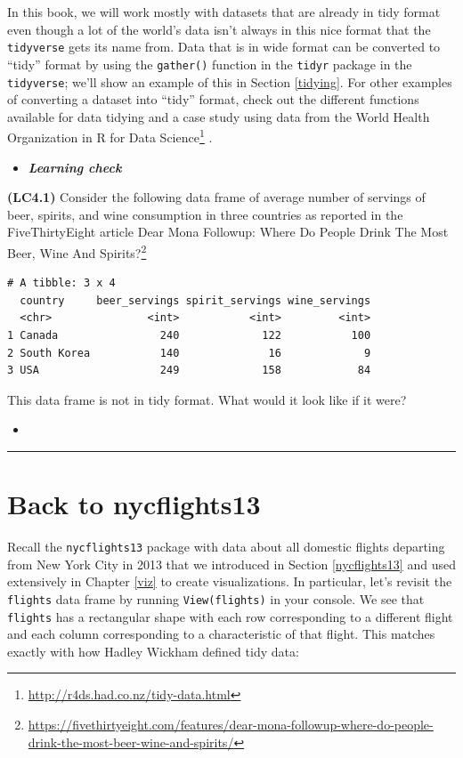 \documentclass[12pt,]{krantz}
\renewcommand{\href}[2]{#2\footnote{\url{#1}}}
\newenvironment{rmdblock}[1]
  {\begin{shaded*}
  \begin{itemize}
  \renewcommand{\labelitemi}{
    \raisebox{-.7\height}[0pt][0pt]{
    }
  }
  \item
  }
  {
  \end{itemize}
  \end{shaded*}
  }
\newenvironment{learncheck}
  {\begin{rmdblock}{warning}}
  {\end{rmdblock}}
\theoremstyle{definition}
\theoremstyle{definition}
\theoremstyle{definition}
\theoremstyle{remark}
\begin{document}
In this book, we will work mostly with datasets that are already in tidy
format even though a lot of the world's data isn't always in this nice
format that the \texttt{tidyverse} gets its name from. Data that is in
wide format can be converted to ``tidy'' format by using the
\texttt{gather()} function in the \texttt{tidyr} package \citep{R-tidyr}
in the \texttt{tidyverse}; we'll show an example of this in Section
\ref{tidying}. For other examples of converting a dataset into ``tidy''
format, check out the different functions available for data tidying and
a case study using data from the World Health Organization in
\href{http://r4ds.had.co.nz/tidy-data.html}{R for Data Science}
\citep{rds2016}.

\begin{learncheck}
\textbf{\emph{Learning check}}
\end{learncheck}

\textbf{(LC4.1)} Consider the following data frame of average number of
servings of beer, spirits, and wine consumption in three countries as
reported in the FiveThirtyEight article
\href{https://fivethirtyeight.com/features/dear-mona-followup-where-do-people-drink-the-most-beer-wine-and-spirits/}{Dear
Mona Followup: Where Do People Drink The Most Beer, Wine And Spirits?}

\begin{verbatim}
# A tibble: 3 x 4
  country     beer_servings spirit_servings wine_servings
  <chr>               <int>           <int>         <int>
1 Canada                240             122           100
2 South Korea           140              16             9
3 USA                   249             158            84
\end{verbatim}

This data frame is not in tidy format. What would it look like if it
were?

\begin{learncheck}

\end{learncheck}

\begin{center}\rule{0.5\linewidth}{\linethickness}\end{center}

\section{Back to nycflights13}\label{back-to-nycflights13}

Recall the \texttt{nycflights13} package with data about all domestic
flights departing from New York City in 2013 that we introduced in
Section \ref{nycflights13} and used extensively in Chapter \ref{viz} to
create visualizations. In particular, let's revisit the \texttt{flights}
data frame by running \texttt{View(flights)} in your console. We see
that \texttt{flights} has a rectangular shape with each row
corresponding to a different flight and each column corresponding to a
characteristic of that flight. This matches exactly with how Hadley
Wickham defined tidy data:
\end{document}
